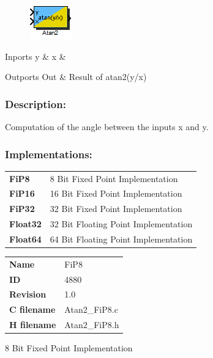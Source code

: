 \label{block:Atan2}
\begin{figure}[H]\includegraphics{Atan2}\end{figure} 

\begin{XtoCtabular}{Inports}
y & \tabularnewline
\hline
x & \tabularnewline
\hline
\end{XtoCtabular}


\begin{XtoCtabular}{Outports}
Out & Result of atan2(y/x)\tabularnewline
\hline
\end{XtoCtabular}

\subsubsection*{Description:}
Computation of the angle between the inputs x and y.


\subsubsection*{Implementations:}
\begin{tabular}{l l}
\textbf{FiP8} & 8 Bit Fixed Point Implementation\tabularnewline
\textbf{FiP16} & 16 Bit Fixed Point Implementation\tabularnewline
\textbf{FiP32} & 32 Bit Fixed Point Implementation\tabularnewline
\textbf{Float32} & 32 Bit Floating Point Implementation\tabularnewline
\textbf{Float64} & 64 Bit Floating Point Implementation\tabularnewline
\end{tabular}

\nopagebreak[0]
\begin{tabular}{l l}
\textbf{Name} & FiP8 \tabularnewline
\textbf{ID} & 4880 \tabularnewline
\textbf{Revision} & 1.0 \tabularnewline
\textbf{C filename} & Atan2\_FiP8.c \tabularnewline
\textbf{H filename} & Atan2\_FiP8.h \tabularnewline
\end{tabular}
\vspace{1ex}

8 Bit Fixed Point Implementation

